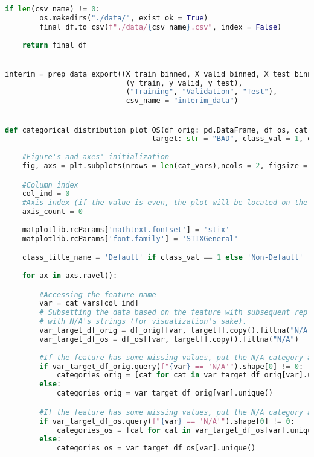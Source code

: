 \begin{lstlisting}[language=Python, basicstyle=\footnotesize\ttfamily]
    if len(csv_name) != 0:
        os.makedirs("./data/", exist_ok = True)
        final_df.to_csv(f"./data/{csv_name}.csv", index = False)
    
    return final_df


interim = prep_data_export((X_train_binned, X_valid_binned, X_test_binned),
                            (y_train, y_valid, y_test),
                            ("Training", "Validation", "Test"),
                            csv_name = "interim_data")


def categorical_distribution_plot_OS(df_orig: pd.DataFrame, df_os, cat_vars: list,
                                  target: str = "BAD", class_val = 1, export: bool = False):
    
    #Figure's and axes' initialization
    fig, axs = plt.subplots(nrows = len(cat_vars),ncols = 2, figsize = (14, 10))

    #Column index
    col_ind = 0
    #Axis index (if the value is even, the plot will be located on the left side, otherwise on the right side)
    axis_count = 0
    
    matplotlib.rcParams['mathtext.fontset'] = 'stix'
    matplotlib.rcParams['font.family'] = 'STIXGeneral'

    class_title_name = 'Default' if class_val == 1 else 'Non-Default'
    
    for ax in axs.ravel():

        #Accessing the feature name
        var = cat_vars[col_ind]
        # Subsetting the data based on the feature with subsequent replacing missing values#
        # with N/A's strings (for visualization's sake).
        var_target_df_orig = df_orig[[var, target]].copy().fillna("N/A")
        var_target_df_os = df_os[[var, target]].copy().fillna("N/A")
        
        #If the feature has some missing values, put the N/A category at the end of the plot.
        if var_target_df_orig.query(f"{var} == 'N/A'").shape[0] != 0:
            categories_orig = [cat for cat in var_target_df_orig[var].unique() if cat != "N/A"] + ["N/A"]
        else:
            categories_orig = var_target_df_orig[var].unique()

        #If the feature has some missing values, put the N/A category at the end of the plot.
        if var_target_df_os.query(f"{var} == 'N/A'").shape[0] != 0:
            categories_os = [cat for cat in var_target_df_os[var].unique() if cat != "N/A"] + ["N/A"]
        else:
            categories_os = var_target_df_os[var].unique()


\end{lstlisting}
